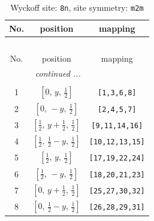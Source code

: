 \documentclass[fleqn,8pt]{jsarticle}
\begin{document}
\begin{longtable}{ccc}
\caption{Wyckoff site: {\tt 8n}, site symmetry: {\tt m2m}}
 \\
 \hline \hline
No. & position & mapping \\ \hline \endfirsthead

\multicolumn{2}{l}{\tablename\ \thetable{}} \\
 \hline \hline
No. & position & mapping \\ \hline \endhead

 \hline \hline
\multicolumn{2}{r}{\footnotesize\it continued ...} \\ \endfoot

 \hline \hline
\multicolumn{2}{r}{} \\ \endlastfoot

1 & $\left[ 0,\, y,\, \frac{1}{2} \right]$ & {\tt [1,3,6,8]} \\ \hline
2 & $\left[ 0,\, - y,\, \frac{1}{2} \right]$ & {\tt [2,4,5,7]} \\ \hline
3 & $\left[ \frac{1}{2},\, y + \frac{1}{2},\, \frac{1}{2} \right]$ & {\tt [9,11,14,16]} \\ \hline
4 & $\left[ \frac{1}{2},\, \frac{1}{2} - y,\, \frac{1}{2} \right]$ & {\tt [10,12,13,15]} \\ \hline
5 & $\left[ \frac{1}{2},\, y,\, \frac{1}{2} \right]$ & {\tt [17,19,22,24]} \\ \hline
6 & $\left[ \frac{1}{2},\, - y,\, \frac{1}{2} \right]$ & {\tt [18,20,21,23]} \\ \hline
7 & $\left[ 0,\, y + \frac{1}{2},\, \frac{1}{2} \right]$ & {\tt [25,27,30,32]} \\ \hline
8 & $\left[ 0,\, \frac{1}{2} - y,\, \frac{1}{2} \right]$ & {\tt [26,28,29,31]} \\
\end{longtable}
\renewcommand{\arraystretch}{1.2}
\end{document}
